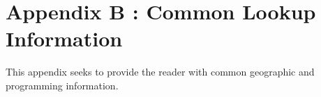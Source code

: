 %
%



\chapter*{Appendix B : Common Lookup Information}

This appendix seeks to provide the reader with common geographic and programming information.




